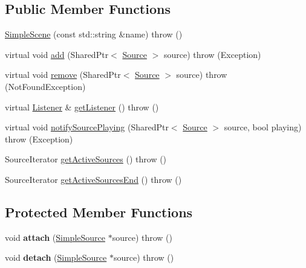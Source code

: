 \subsection*{Public Member Functions}
\begin{DoxyCompactItemize}
\item 
\hyperlink{classAudio_1_1SimpleScene_ace78f0e17cfff95544f5cc0b7af4a37f}{Simple\+Scene} (const std\+::string \&name)  throw ()
\item 
virtual void \hyperlink{classAudio_1_1SimpleScene_ad9695704e2b761339a9a5cd9c4f397a6}{add} (Shared\+Ptr$<$ \hyperlink{classAudio_1_1Source}{Source} $>$ source)  throw (\+Exception)
\item 
virtual void \hyperlink{classAudio_1_1SimpleScene_a8bdf43929c24c50b0e55168d7e5ec916}{remove} (Shared\+Ptr$<$ \hyperlink{classAudio_1_1Source}{Source} $>$ source)  throw (\+Not\+Found\+Exception)
\item 
virtual \hyperlink{classAudio_1_1Listener}{Listener} \& \hyperlink{classAudio_1_1SimpleScene_a622b6ee2aaec922ed30059a94da1e6f6}{get\+Listener} ()  throw ()
\item 
virtual void \hyperlink{classAudio_1_1SimpleScene_a3e7ce780db55bb23bebe5ee90b5c9a37}{notify\+Source\+Playing} (Shared\+Ptr$<$ \hyperlink{classAudio_1_1Source}{Source} $>$ source, bool playing)  throw (\+Exception)
\item 
Source\+Iterator \hyperlink{classAudio_1_1SimpleScene_a2fb180eb6a9683bbf9b77d17776562e0}{get\+Active\+Sources} ()  throw ()
\item 
Source\+Iterator \hyperlink{classAudio_1_1SimpleScene_a937c4f1f6bf6f88a31843dcdda3a28e4}{get\+Active\+Sources\+End} ()  throw ()
\end{DoxyCompactItemize}
\subsection*{Protected Member Functions}
\begin{DoxyCompactItemize}
\item 
void {\bfseries attach} (\hyperlink{classAudio_1_1SimpleSource}{Simple\+Source} $\ast$source)  throw ()\hypertarget{classAudio_1_1SimpleScene_a796e76029ea72058fcbc6b9e2aed398e}{}\label{classAudio_1_1SimpleScene_a796e76029ea72058fcbc6b9e2aed398e}

\item 
void {\bfseries detach} (\hyperlink{classAudio_1_1SimpleSource}{Simple\+Source} $\ast$source)  throw ()\hypertarget{classAudio_1_1SimpleScene_ae709d8c2b5b7b13683421c6cb9b57909}{}\label{classAudio_1_1SimpleScene_ae709d8c2b5b7b13683421c6cb9b57909}

\end{DoxyCompactItemize}



